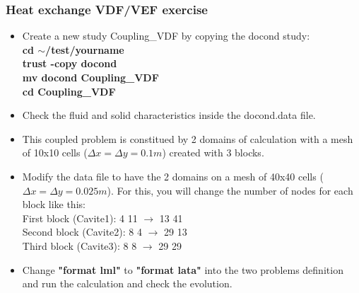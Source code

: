 \documentclass[10pt]{beamer}
\begin{document}
\begin{frame}
\frametitle{Heat exchange VDF/VEF exercise}
\begin{block}{}

\begin{itemize}
\item Create a new study Coupling\_VDF by copying the docond study:\\
\textbf{cd $\sim$/test/yourname} \\
\textbf{trust -copy docond} \\
\textbf{mv docond Coupling\_VDF} \\
\textbf{cd Coupling\_VDF} \\

\item Check the fluid and solid characteristics inside the docond.data file.

\item This coupled problem is constitued by 2 domains of calculation with a mesh of 10x10 cells ($\Delta x = \Delta y = 0.1m$) created with 3 blocks. 

\item Modify the data file to have the 2 domains on a mesh of 40x40 cells ($\Delta x= \Delta y=0.025m$). For this, you will change the number of nodes for each block like this:\\
First block (Cavite1): 4 11 $\rightarrow$ 13 41 \\
Second block (Cavite2): 8 4 $\rightarrow$ 29 13 \\ 
Third block (Cavite3): 8 8  $\rightarrow$ 29 29 \\

\item Change \textbf{"format lml"} to \textbf{"format lata"} into the two problems definition and run the calculation and check the evolution. 
\end{itemize}

\end{block}
\end{frame}
\end{document}
